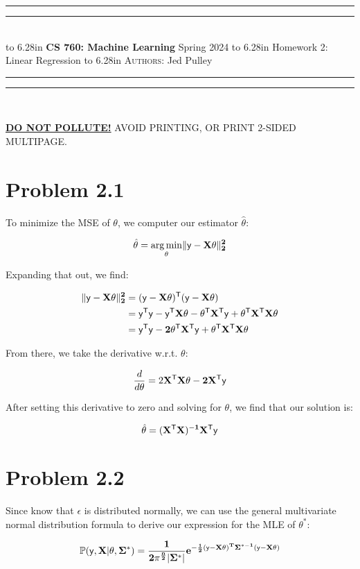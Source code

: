 \documentclass{article}
\newcommand{\lecture}[2]{
\pagestyle{myheadings}
\thispagestyle{plain}
\newpage
\noindent
\begin{center}
\rule{\textwidth}{1.6pt}\vspace*{-\baselineskip}\vspace*{2pt} %
\rule{\textwidth}{0.4pt}\\[1\baselineskip] %
\vbox{\vspace{2mm}
\hbox to 6.28in { {\bf CS 760: Machine Learning} \hfill Spring 2024 }
\vspace{4mm}
\hbox to 6.28in { {\Large \hfill #1  \hfill} }
\vspace{4mm}
\hbox to 6.28in { {\scshape Authors:}  #2 \hfill }}
\vspace{-2mm}
\rule{\textwidth}{0.4pt}\vspace*{-\baselineskip}\vspace{3.2pt} %
\rule{\textwidth}{1.6pt}\\[\baselineskip] %
\end{center}
\vspace*{4mm}
}
\begin{document}
\lecture{Homework 2: Linear Regression}{Jed Pulley}

\begin{center}
{\Large {\sf \underline{\textbf{DO NOT POLLUTE!}} AVOID PRINTING, OR PRINT 2-SIDED MULTIPAGE.}}
\end{center}

\section*{Problem 2.1}

To minimize the MSE of $\theta$, we computer our estimator $\hat{\theta}$:

\[\hat{\theta} = \underset{\theta}{\arg\min} \Vert \bf{\sf{y}}  - \bf{X}  \theta \Vert ^2_2 \]

Expanding that out, we find:

\begin{align*}
  \Vert \bf{\sf{y}}  - \bf{X}  \theta \Vert ^2_2 
  & = (\bf{\sf{y}} - \bf{X}  {\theta})^{\sf{T}}(\bf{\sf{y}} - \bf{X}  {\theta}) \\
  & = \bf{\sf{y}}^{\sf{T}}\bf{\sf{y}} - \bf{\sf{y}}^{\sf{T}}\bf{X}{\theta} - {\theta}^{\sf{T}}\bf{X}^{\sf{T}}\bf{\sf{y}} + {\theta}^{\sf{T}}\bf{X}^{\sf{T}}\bf{X}{\theta} \\
  & = \bf{\sf{y}}^{\sf{T}}\bf{\sf{y}} - 2{\theta}^{\sf{T}}\bf{X}^{\sf{T}}\bf{\sf{y}} + {\theta}^{\sf{T}}\bf{X}^{\sf{T}}\bf{X}{\theta}
\end{align*}

From there, we take the derivative w.r.t. $\theta$:

\begin{align*}
  \frac{d}{d\theta} = 2\bf{X}^{\sf{T}}\bf{X}{\theta} - 2\bf{X}^{\sf{T}}\bf{\sf{y}}
\end{align*}

After setting this derivative to zero and solving for $\theta$, we find that our solution is:

\[\hat{\theta} = (\bf{X}^{\sf{T}}\bf{X})^{-1}\bf{X}^{\sf{T}}\bf{\sf{y}}\]

\section*{Problem 2.2}

Since know that $\epsilon$ is distributed normally, we can use the general multivariate normal distribution formula to derive our expression for the MLE of $\theta^{*}$:

\begin{align*}
  \mathbb{P}(\sf{y}, \bf{X} | \theta,\Sigma^{*}) = \frac{1}{{2\pi^{\frac{n}{2}} | \Sigma^{*} | }}e^{-\frac{1}{2}(\sf{y} - \bf{X} \theta)^T\Sigma^{*-1}(\sf{y} - \bf{X} \theta)}
\end{align*}
\end{document}
